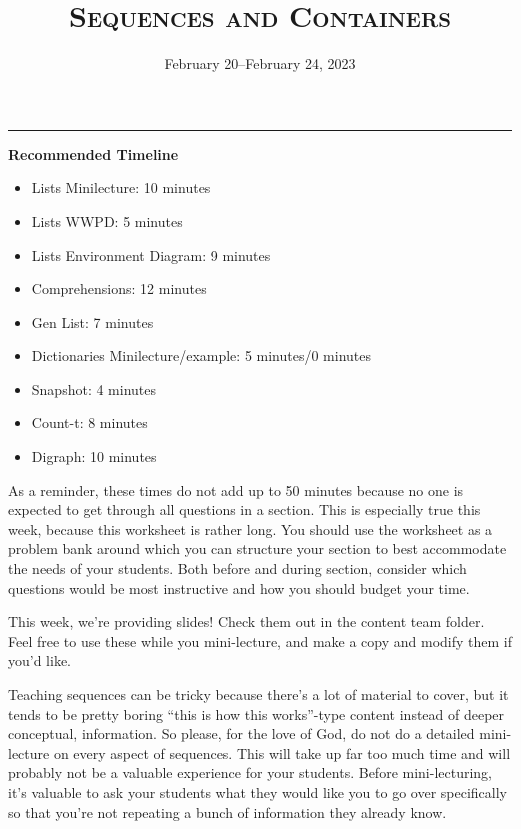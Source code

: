 \documentclass{exam}
\title{\textsc{Sequences and Containers}}
\date{February 20--February 24, 2023}
\begin{document}
\maketitle
\rule{\textwidth}{0.15em}


\begin{meta}
    \textbf{Recommended Timeline}
    \begin{itemize}
        \item Lists Minilecture: 10 minutes
        \item Lists WWPD: 5 minutes
        \item Lists Environment Diagram: 9 minutes
        \item Comprehensions: 12 minutes
        \item Gen List: 7 minutes
        \item Dictionaries Minilecture/example: 5 minutes/0 minutes
        \item Snapshot: 4 minutes
        \item Count-t: 8 minutes
        \item Digraph: 10 minutes
    \end{itemize}

    As a reminder, these times do not add up to 50 minutes because no one is expected 
    to get through all questions in a section. This is especially true this week, 
    because this worksheet is rather long. You should use the worksheet as a problem bank
     around which you can structure your section to best accommodate the needs of your 
     students. Both before and during section, consider which questions would be most 
     instructive and how you should budget your time.

    This week, we're providing slides! Check them out in the content team folder. 
    Feel free to use these while you mini-lecture, and make a copy and modify them 
    if you'd like. 

    Teaching sequences can be tricky because there's a lot of material to cover, but 
    it tends to be pretty boring ``this is how this works''-type content instead of 
    deeper conceptual, information. So please, for the love of God, do not do a detailed 
    mini-lecture on every aspect of sequences. This will take up far too much time and 
    will probably not be a valuable experience for your students. Before mini-lecturing, 
    it's valuable to ask your students what they would like you to go over specifically 
    so that you're not repeating a bunch of information they already know. 
\end{meta}
\end{document}
